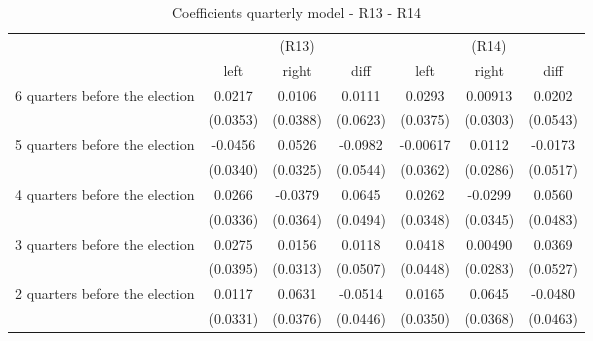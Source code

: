 \begin{table}[!ht]\centering \footnotesize
\def\sym#1{\ifmmode^{#1}\else\(^{#1}\)\fi}
\caption{Coefficients quarterly model - R13 - R14}
\begin{tabular}{l*{6}{c}}
\hline\hline
                    &\multicolumn{3}{c}{(R13)}&\multicolumn{3}{c}{(R14)}\\
&\multicolumn{1}{c}{left}&\multicolumn{1}{c}{right}&\multicolumn{1}{c}{diff}&\multicolumn{1}{c}{left}&\multicolumn{1}{c}{right}&\multicolumn{1}{c}{diff}\\
\hline
 6 quarters before the election&      0.0217         &      0.0106         &      0.0111         &      0.0293         &     0.00913         &      0.0202         \\
                    &    (0.0353)         &    (0.0388)         &    (0.0623)         &    (0.0375)         &    (0.0303)         &    (0.0543)         \\
[0.5em]
 5 quarters before the election&     -0.0456         &      0.0526         &     -0.0982         &    -0.00617         &      0.0112         &     -0.0173         \\
                    &    (0.0340)         &    (0.0325)         &    (0.0544)         &    (0.0362)         &    (0.0286)         &    (0.0517)         \\
[0.5em]
 4 quarters before the election&      0.0266         &     -0.0379         &      0.0645         &      0.0262         &     -0.0299         &      0.0560         \\
                    &    (0.0336)         &    (0.0364)         &    (0.0494)         &    (0.0348)         &    (0.0345)         &    (0.0483)         \\
[0.5em]
 3 quarters before the election&      0.0275         &      0.0156         &      0.0118         &      0.0418         &     0.00490         &      0.0369         \\
                    &    (0.0395)         &    (0.0313)         &    (0.0507)         &    (0.0448)         &    (0.0283)         &    (0.0527)         \\
[0.5em]
 2 quarters before the election&      0.0117         &      0.0631         &     -0.0514         &      0.0165         &      0.0645         &     -0.0480         \\
                    &    (0.0331)         &    (0.0376)         &    (0.0446)         &    (0.0350)         &    (0.0368)         &    (0.0463)         \\

\end{tabular}
\end{table}
